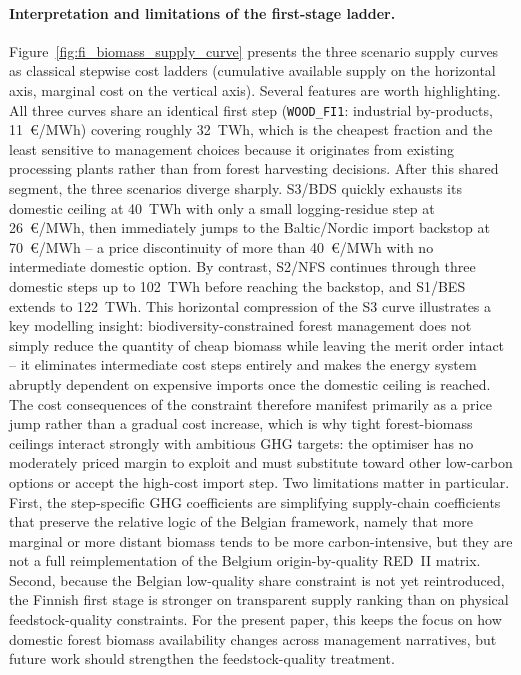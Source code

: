 \documentclass{article}
\begin{document}
\paragraph{Interpretation and limitations of the first-stage ladder.}
Figure~\ref{fig:fi_biomass_supply_curve} presents the three scenario supply curves as classical stepwise cost ladders (cumulative available supply on the horizontal axis, marginal cost on the vertical axis). Several features are worth highlighting. All three curves share an identical first step (\texttt{WOOD\_FI1}: industrial by-products, 11~€/MWh) covering roughly 32~TWh, which is the cheapest fraction and the least sensitive to management choices because it originates from existing processing plants rather than from forest harvesting decisions. After this shared segment, the three scenarios diverge sharply. S3/BDS quickly exhausts its domestic ceiling at 40~TWh with only a small logging-residue step at 26~€/MWh, then immediately jumps to the Baltic/Nordic import backstop at 70~€/MWh -- a price discontinuity of more than 40~€/MWh with no intermediate domestic option. By contrast, S2/NFS continues through three domestic steps up to 102~TWh before reaching the backstop, and S1/BES extends to 122~TWh. This horizontal compression of the S3 curve illustrates a key modelling insight: biodiversity-constrained forest management does not simply reduce the quantity of cheap biomass while leaving the merit order intact -- it eliminates intermediate cost steps entirely and makes the energy system abruptly dependent on expensive imports once the domestic ceiling is reached. The cost consequences of the constraint therefore manifest primarily as a price jump rather than a gradual cost increase, which is why tight forest-biomass ceilings interact strongly with ambitious GHG targets: the optimiser has no moderately priced margin to exploit and must substitute toward other low-carbon options or accept the high-cost import step. Two limitations matter in particular. First, the step-specific GHG coefficients are simplifying supply-chain coefficients that preserve the relative logic of the Belgian framework, namely that more marginal or more distant biomass tends to be more carbon-intensive, but they are not a full reimplementation of the Belgium origin-by-quality RED~II matrix. Second, because the Belgian low-quality share constraint is not yet reintroduced, the Finnish first stage is stronger on transparent supply ranking than on physical feedstock-quality constraints. For the present paper, this keeps the focus on how domestic forest biomass availability changes across management narratives, but future work should strengthen the feedstock-quality treatment.
\end{document}

